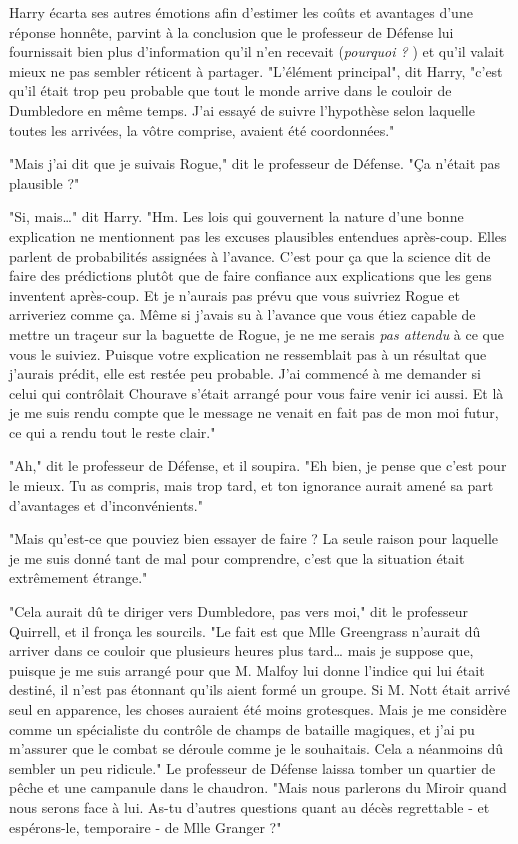 Harry écarta ses autres émotions afin d'estimer les coûts et avantages d'une réponse honnête, parvint à la conclusion que le professeur de Défense lui fournissait bien plus d'information qu'il n'en recevait (\emph{pourquoi ?} ) et qu'il valait mieux ne pas sembler réticent à partager. "L'élément principal", dit Harry, "c'est qu'il était trop peu probable que tout le monde arrive dans le couloir de Dumbledore en même temps. J'ai essayé de suivre l'hypothèse selon laquelle toutes les arrivées, la vôtre comprise, avaient été coordonnées."

"Mais j'ai dit que je suivais Rogue," dit le professeur de Défense. "Ça n'était pas plausible ?"

"Si, mais…" dit Harry. "Hm. Les lois qui gouvernent la nature d'une bonne explication ne mentionnent pas les excuses plausibles entendues après-coup. Elles parlent de probabilités assignées à l'avance. C'est pour ça que la science dit de faire des prédictions plutôt que de faire confiance aux explications que les gens inventent après-coup. Et je n'aurais pas prévu que vous suivriez Rogue et arriveriez comme ça. Même si j'avais su à l'avance que vous étiez capable de mettre un traçeur sur la baguette de Rogue, je ne me serais \emph{pas attendu}  à ce que vous le suiviez. Puisque votre explication ne ressemblait pas à un résultat que j'aurais prédit, elle est restée peu probable. J'ai commencé à me demander si celui qui contrôlait Chourave s'était arrangé pour vous faire venir ici aussi. Et là je me suis rendu compte que le message ne venait en fait pas de mon moi futur, ce qui a rendu tout le reste clair."

"Ah," dit le professeur de Défense, et il soupira. "Eh bien, je pense que c'est pour le mieux. Tu as compris, mais trop tard, et ton ignorance aurait amené sa part d'avantages et d'inconvénients."

"Mais qu'est-ce que pouviez bien essayer de faire ? La seule raison pour laquelle je me suis donné tant de mal pour comprendre, c'est que la situation était extrêmement étrange."

"Cela aurait dû te diriger vers Dumbledore, pas vers moi," dit le professeur Quirrell, et il fronça les sourcils. "Le fait est que Mlle Greengrass n'aurait dû arriver dans ce couloir que plusieurs heures plus tard… mais je suppose que, puisque je me suis arrangé pour que M. Malfoy lui donne l'indice qui lui était destiné, il n'est pas étonnant qu'ils aient formé un groupe. Si M. Nott était arrivé seul en apparence, les choses auraient été moins grotesques. Mais je me considère comme un spécialiste du contrôle de champs de bataille magiques, et j'ai pu m'assurer que le combat se déroule comme je le souhaitais. Cela a néanmoins dû sembler un peu ridicule." Le professeur de Défense laissa tomber un quartier de pêche et une campanule dans le chaudron. "Mais nous parlerons du Miroir quand nous serons face à lui. As-tu d'autres questions quant au décès regrettable - et espérons-le, temporaire - de Mlle Granger ?"

